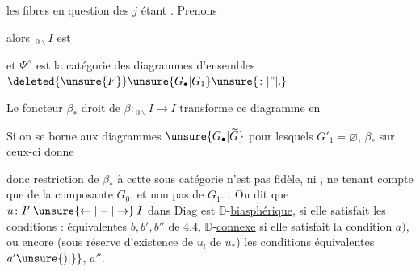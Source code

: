les fibres en question des $j$ étant . Prenons


alors $\,{}_{0\backslash}I$ est


et $\Psi^\wedge$ est la catégorie des diagrammes d'ensembles $\deleted{\unsure{F}}\unsure{G_\bullet|G_1}\unsure{\colon|\text{''}|.}$


Le foncteur $\beta_*$  droit\unsure{,} de $\beta\colon{}_{0\backslash}I\to I$ transforme ce diagramme en


Si on se borne aux diagrammes $\unsure{G_\bullet|\widetilde G}$ pour lesquels $G'_1=\varnothing$, $\beta_*$ sur ceux-ci donne


donc  restriction de $\beta_*$ à cette sous catégorie  n'est pas  fidèle, ni , ne tenant compte que de la composante $G_0$, et non pas de $G_1$.
\uline{} . On dit que $u\colon I'\mathbin{\unsure{\leftarrow|-|\to}}I$ dans $\mathrm{Diag}$ est $\mathbb{D}$-\uline{biasphérique},  si elle satisfait les conditions : équivalentes $b,b',b''$ de 4.4, $\mathbb{D}$-\uline{connexe} si elle satisfait la condition $a)$, ou encore (sous réserve d'existence de $u_!$  de $u_*$) les conditions équivalentes $a'\unsure{)|\}}$, $a''$.

